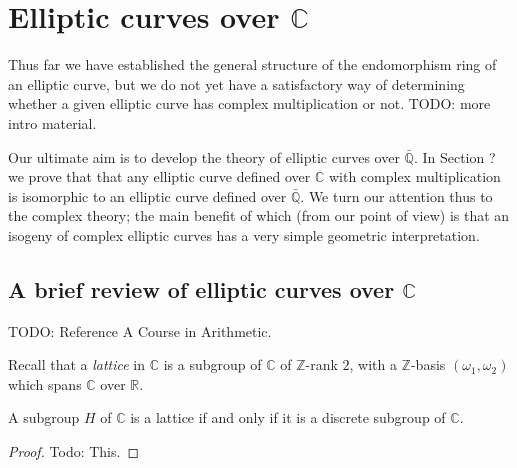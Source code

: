 \newpage
\section{Elliptic curves over $\mathbb{C}$}
\label{sec:compl-mult-over-C}

Thus far we have established the general structure of the endomorphism ring of an
elliptic curve, but we do not yet have a satisfactory way of determining whether a
given elliptic curve has complex multiplication or not.
TODO: more intro material.

Our ultimate aim is to develop the theory of elliptic curves over $\mathbb{\bar{Q}}$.
In Section ? we prove that that any elliptic curve defined over $\mathbb{C}$ with
complex multiplication is isomorphic to an elliptic curve defined over
$\mathbb{\bar{Q}}$.  We turn our attention thus to the complex theory; the main
benefit of which (from our point of view) is that an isogeny of complex elliptic
curves has a very simple geometric interpretation.  

\subsection{A brief review of elliptic curves over $\mathbb{C}$}
\label{sec:review-complex-curves}



TODO: Reference A Course in Arithmetic.

Recall that a \emph{lattice} in $\mathbb{C}$ is a subgroup of $\mathbb{C}$ of
$\mathbb{Z}$-rank $2$, with a $\mathbb{Z}$-basis $(\omega_{1},\omega_{2})$ which
spans $\mathbb{C}$ over $\mathbb{R}$.  

\begin{lem}
  \label{lem:latice-iff-discrete}
  A subgroup $H$ of $\mathbb{C}$ is a lattice if and only if it is a discrete
  subgroup of $\mathbb{C}$.
\end{lem}
\begin{proof}
  Todo: This.
\end{proof}

